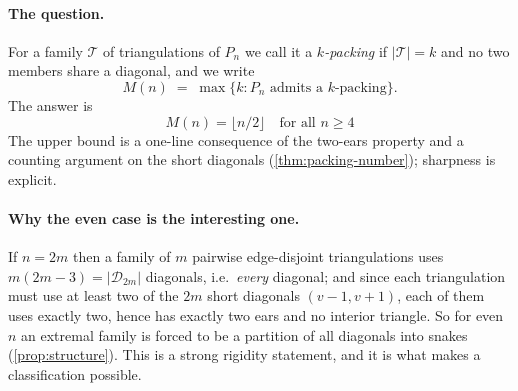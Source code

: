 \documentclass[11pt,a4paper]{article}
\theoremstyle{definition}
\theoremstyle{remark}
\newcommand{\diags}{\ensuremath{\mathcal{D}}}
\begin{document}
\paragraph{The question.}
For a family $\mathcal{T}$ of triangulations of $P_n$ we call it a \emph{$k$-packing} if
$|\mathcal{T}|=k$ and no two members share a diagonal, and we write
\[
  M(n)\;=\;\max\{k : \text{$P_n$ admits a $k$-packing}\}.
\]
The answer is
\[
  \boxed{\,M(n)=\lfloor n/2\rfloor \quad\text{for all } n\ge4\,} \tag{0}
\]
The upper bound is a one-line consequence of the two-ears property and a counting
argument on the short diagonals (\cref{thm:packing-number}); sharpness is explicit.

\paragraph{Why the even case is the interesting one.}
If $n=2m$ then a family of $m$ pairwise edge-disjoint triangulations uses
$m(2m-3)=|\diags_{2m}|$ diagonals, i.e.\ \emph{every} diagonal; and since each triangulation
must use at least two of the $2m$ short diagonals $(v-1,v+1)$, each of them uses exactly
two, hence has exactly two ears and no interior triangle.  So for even $n$ an extremal
family is forced to be a partition of all diagonals into snakes (\cref{prop:structure}).
This is a strong rigidity statement, and it is what makes a classification possible.
\end{document}
